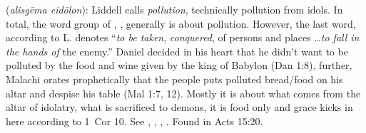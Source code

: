\item[Idol pollution,]

(\textit{alisgēma eidōlon}):
Liddell calls  \emph{pollution}, technically pollution from idols. In total, the word group of , ,  generally is about pollution. However, the last word, according to L. denotes ``\emph{to be taken}, \emph{conquered}, of persons and places \ldots \emph{to fall in the hands of} the enemy.'' Daniel decided in his heart that he didn't want to be polluted by the food and wine given by the king of Babylon (Dan 1:8), further, Malachi orates prophetically that the people puts polluted bread/food on his altar and despise his table (Mal 1:7, 12). Mostly it is about what comes from the altar of idolatry, what is sacrificed to demons, it is food only and grace kicks in here according to 1~Cor 10. See , , , .
Found in Acts 15:20.
